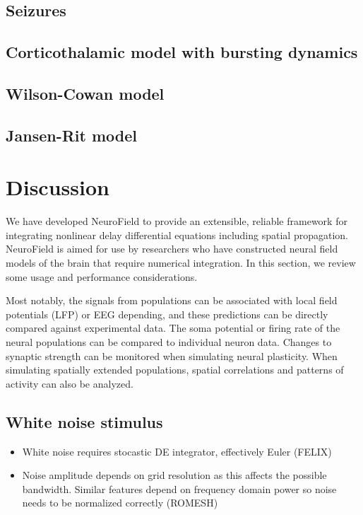 \documentclass[preprint,review,10pt,authoryear,letterpaper]{elsarticle}
\begin{document}
\clearpage

\subsection{Seizures}
\label{sec:seizures}

\subsection{Corticothalamic model with bursting dynamics}
\label{sec:burst}


\subsection{Wilson-Cowan model}

\subsection{Jansen-Rit model}

\section{Discussion}
\label{sec:discussion}

We have developed NeuroField to provide an extensible, reliable framework for integrating nonlinear delay differential equations including spatial propagation. NeuroField is aimed for use by researchers who have constructed neural field models of the brain that require numerical integration. In this section, we review some usage and performance considerations.

Most notably, the signals from populations can be associated with local field potentials (LFP) or EEG depending, and these predictions can be directly compared against experimental data. The soma potential or firing rate of the neural populations can be compared to individual neuron data. Changes to synaptic strength can be monitored when simulating neural plasticity. When simulating spatially extended populations, spatial correlations and patterns of activity can also be analyzed. 

\subsection{White noise stimulus}
\begin{itemize}
	\item White noise requires stocastic DE integrator, effectively Euler (FELIX)
	\item Noise amplitude depends on grid resolution as this affects the possible bandwidth. Similar features depend on frequency domain power so noise needs to be normalized correctly (ROMESH)
\end{itemize}
\end{document}

